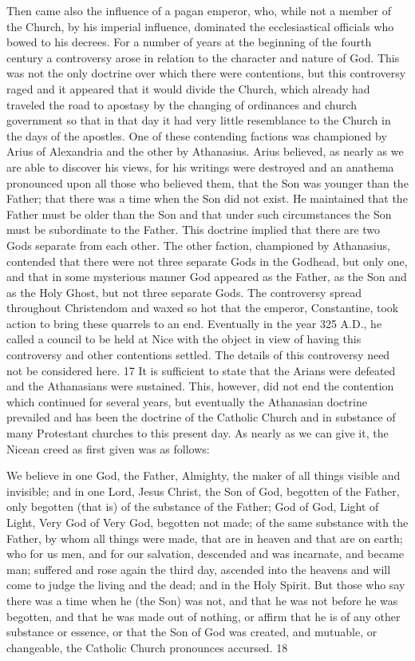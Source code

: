 Then came also the influence of a pagan emperor, who, while not a member of the Church,
by his imperial influence, dominated the ecclesiastical officials who bowed to his decrees.
For a number of years at the beginning of the fourth century a controversy arose in relation to
the character and nature of God. This was not the only doctrine over which there were
contentions, but this controversy raged and it appeared that it would divide the Church,
which already had traveled the road to apostasy by the changing of ordinances and church
government so that in that day it had very little resemblance to the Church in the days of the
apostles. One of these contending factions was championed by Arius of Alexandria and the
other by Athanasius. Arius believed, as nearly as we are able to discover his views, for his
writings were destroyed and an anathema pronounced upon all those who believed them, that
the Son was younger than the Father; that there was a time when the Son did not exist. He
maintained that the Father must be older than the Son and that under such circumstances the
Son must be subordinate to the Father. This doctrine implied that there are two Gods separate
from each other. The other faction, championed by Athanasius, contended that there were not
three separate Gods in the Godhead, but only one, and that in some mysterious manner God
appeared as the Father, as the Son and as the Holy Ghost, but not three separate Gods. The
controversy spread throughout Christendom and waxed so hot that the emperor, Constantine,
took action to bring these quarrels to an end. Eventually in the year 325 A.D., he called a
council to be held at Nice with the object in view of having this controversy and other
contentions settled. The details of this controversy need not be considered here. 17 It is
sufficient to state that the Arians were defeated and the Athanasians were sustained. This,
however, did not end the contention which continued for several years, but eventually the
Athanasian doctrine prevailed and has been the doctrine of the Catholic Church and in
substance of many Protestant churches to this present day. As nearly as we can give it, the
Nicean creed as first given was as follows:

We believe in one God, the Father, Almighty, the maker of all things visible and invisible;
and in one Lord, Jesus Christ, the Son of God, begotten of the Father, only begotten (that is)
of the substance of the Father; God of God, Light of Light, Very God of Very God, begotten
not made; of the same substance with the Father, by whom all things were made, that are in
heaven and that are on earth; who for us men, and for our salvation, descended and was
incarnate, and became man; suffered and rose again the third day, ascended into the heavens
and will come to judge the living and the dead; and in the Holy Spirit. But those who say
there was a time when he (the Son) was not, and that he was not before he was begotten, and
that he was made out of nothing, or affirm that he is of any other substance or essence, or that
the Son of God was created, and mutuable, or changeable, the Catholic Church pronounces
accursed. 18

